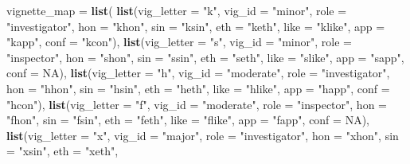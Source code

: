\documentclass[
]{article}
\newenvironment{Shaded}{\begin{snugshade}}{\end{snugshade}}
\newcommand{\AttributeTok}[1]{\textcolor[rgb]{0.13,0.29,0.53}{#1}}
\newcommand{\ConstantTok}[1]{\textcolor[rgb]{0.56,0.35,0.01}{#1}}
\newcommand{\FunctionTok}[1]{\textcolor[rgb]{0.13,0.29,0.53}{\textbf{#1}}}
\newcommand{\NormalTok}[1]{#1}
\newcommand{\OtherTok}[1]{\textcolor[rgb]{0.56,0.35,0.01}{#1}}
\newcommand{\StringTok}[1]{\textcolor[rgb]{0.31,0.60,0.02}{#1}}
\begin{document}
\begin{Shaded}
\begin{Highlighting}[]
\NormalTok{vignette\_map }\OtherTok{=} \FunctionTok{list}\NormalTok{(}
  \FunctionTok{list}\NormalTok{(}\AttributeTok{vig\_letter =} \StringTok{"k"}\NormalTok{, }\AttributeTok{vig\_id =} \StringTok{"minor"}\NormalTok{,    }\AttributeTok{role =} \StringTok{"investigator"}\NormalTok{,}
       \AttributeTok{hon =} \StringTok{"khon"}\NormalTok{, }\AttributeTok{sin =} \StringTok{"ksin"}\NormalTok{,  }\AttributeTok{eth =} \StringTok{"keth"}\NormalTok{,}
       \AttributeTok{like =} \StringTok{"klike"}\NormalTok{,  }\AttributeTok{app =} \StringTok{"kapp"}\NormalTok{,  }\AttributeTok{conf =} \StringTok{"kcon"}\NormalTok{),}
  \FunctionTok{list}\NormalTok{(}\AttributeTok{vig\_letter =} \StringTok{"s"}\NormalTok{, }\AttributeTok{vig\_id =} \StringTok{"minor"}\NormalTok{,    }\AttributeTok{role =} \StringTok{"inspector"}\NormalTok{,}
       \AttributeTok{hon =} \StringTok{"shon"}\NormalTok{,    }\AttributeTok{sin =} \StringTok{"ssin"}\NormalTok{,  }\AttributeTok{eth =} \StringTok{"seth"}\NormalTok{,}
       \AttributeTok{like =} \StringTok{"slike"}\NormalTok{,  }\AttributeTok{app =} \StringTok{"sapp"}\NormalTok{,  }\AttributeTok{conf =} \ConstantTok{NA}\NormalTok{),}
  \FunctionTok{list}\NormalTok{(}\AttributeTok{vig\_letter =} \StringTok{"h"}\NormalTok{, }\AttributeTok{vig\_id =} \StringTok{"moderate"}\NormalTok{, }\AttributeTok{role =} \StringTok{"investigator"}\NormalTok{,}
       \AttributeTok{hon =} \StringTok{"hhon"}\NormalTok{,    }\AttributeTok{sin =} \StringTok{"hsin"}\NormalTok{,  }\AttributeTok{eth =} \StringTok{"heth"}\NormalTok{,}
       \AttributeTok{like =} \StringTok{"hlike"}\NormalTok{,  }\AttributeTok{app =} \StringTok{"happ"}\NormalTok{,  }\AttributeTok{conf =} \StringTok{"hcon"}\NormalTok{),}
  \FunctionTok{list}\NormalTok{(}\AttributeTok{vig\_letter =} \StringTok{"f"}\NormalTok{, }\AttributeTok{vig\_id =} \StringTok{"moderate"}\NormalTok{, }\AttributeTok{role =} \StringTok{"inspector"}\NormalTok{,}
       \AttributeTok{hon =} \StringTok{"fhon"}\NormalTok{,    }\AttributeTok{sin =} \StringTok{"fsin"}\NormalTok{,  }\AttributeTok{eth =} \StringTok{"feth"}\NormalTok{,}
       \AttributeTok{like =} \StringTok{"flike"}\NormalTok{,  }\AttributeTok{app =} \StringTok{"fapp"}\NormalTok{,  }\AttributeTok{conf =} \ConstantTok{NA}\NormalTok{),}
  \FunctionTok{list}\NormalTok{(}\AttributeTok{vig\_letter =} \StringTok{"x"}\NormalTok{, }\AttributeTok{vig\_id =} \StringTok{"major"}\NormalTok{,    }\AttributeTok{role =} \StringTok{"investigator"}\NormalTok{,}
       \AttributeTok{hon =} \StringTok{"xhon"}\NormalTok{,   }\AttributeTok{sin =} \StringTok{"xsin"}\NormalTok{,  }\AttributeTok{eth =} \StringTok{"xeth"}\NormalTok{,}

\end{Highlighting}
\end{Shaded}
\end{document}
